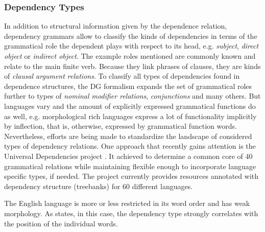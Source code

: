 \subsubsection{Dependency Types} \label{subsec:dependency_types}
In addition to structural  information given by the dependence relation, dependency grammars allow to classify the kinds of dependencies in terms of the grammatical role the dependent plays with respect to its head, e.g. \textit{subject}, \textit{direct object} or \textit{indirect object}. The example roles mentioned are commonly known and relate to the main finite verb. Because they link phrases of clauses, they are kinds of \textit{clausal argument relations}. To classify all types of dependencies found in dependence structures, the \ac{DG} formalism expands the set of grammatical roles further to types of \textit{nominal modifier relations}, \textit{conjunctions} and many others. But languages vary and the amount of explicitly expressed grammatical functions do as well, e.g. morphological rich languages express a lot of functionality implicitly by inflection, that is, otherwise, expressed by grammatical function words. Nevertheless, efforts are being made to standardize the landscape of considered types of dependency relations. One approach that recently gains attention is the Universal Dependencies project \autocite{nivre_universal_2016}. It achieved to determine a common core of 40 grammatical relations while maintaining flexible enough to incorporate language specific types, if needed. The project currently provides resources annotated with dependency structure (treebanks) for 60 different languages.

The English language is more or less restricted in its word order and has weak morphology. As \textcite{jurafsky_dependency_2014} states, in this case, the dependency type strongly correlates with the position of the individual words.



